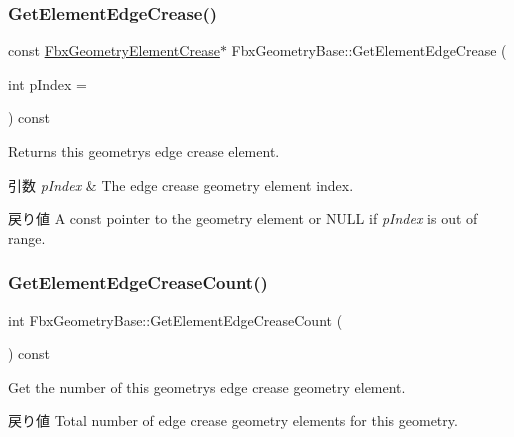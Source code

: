 \subsubsection{\texorpdfstring{Get\+Element\+Edge\+Crease()}{GetElementEdgeCrease()}\hspace{0.1cm}{\footnotesize\ttfamily [2/2]}}
{\footnotesize\ttfamily const \hyperlink{fbxlayer_8h_aa1db71d39153856548f192cf52aa2cc5}{Fbx\+Geometry\+Element\+Crease}$\ast$ Fbx\+Geometry\+Base\+::\+Get\+Element\+Edge\+Crease (\begin{DoxyParamCaption}\item[{int}]{p\+Index = {} }\end{DoxyParamCaption}) const}

Returns this geometry\textquotesingle{}s edge crease element. 
\begin{DoxyParams}{引数}
{\em p\+Index} & The edge crease geometry element index. \\
\hline
\end{DoxyParams}
\begin{DoxyReturn}{戻り値}
A const pointer to the geometry element or {\ttfamily N\+U\+LL} if {\itshape p\+Index} is out of range. 
\end{DoxyReturn}
\mbox{\label{class_fbx_geometry_base_aeafa5b8ecd4a424003624e2e35978033}} 
\subsubsection{\texorpdfstring{Get\+Element\+Edge\+Crease\+Count()}{GetElementEdgeCreaseCount()}}
{\footnotesize\ttfamily int Fbx\+Geometry\+Base\+::\+Get\+Element\+Edge\+Crease\+Count (\begin{DoxyParamCaption}{ }\end{DoxyParamCaption}) const}

Get the number of this geometry\textquotesingle{}s edge crease geometry element. \begin{DoxyReturn}{戻り値}
Total number of edge crease geometry elements for this geometry. 
\end{DoxyReturn}
\mbox{\label{class_fbx_geometry_base_af4daaf3e4a61bfd482d70d41d0a9e350}} 
